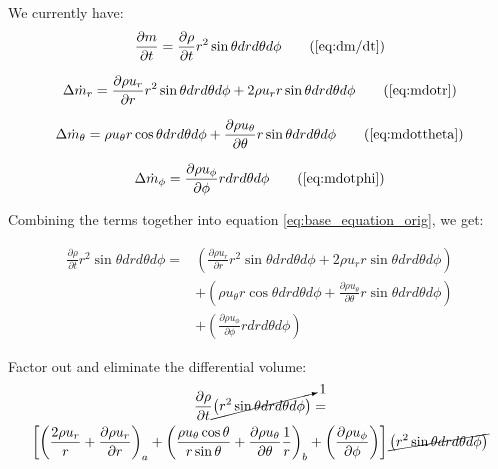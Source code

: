\documentclass[12pt, letterpaper, twoside]{article}
\begin{document}
We currently have:
    \begin{equation}
        \frac{\partial m}{\partial t} = 
        \frac{\partial \rho}{\partial t} r^2 \sin\theta dr d\theta d\phi
        \tag{\ref{eq:dm/dt}}
    \end{equation}

    \begin{equation}
        \Delta\dot{m}_r = \frac{\partial \rho u_r}{\partial r} r^2 \sin\theta dr d\theta d\phi +
        2\rho u_r r\sin\theta dr d\theta d\phi
        \tag{\ref{eq:mdotr}}
    \end{equation}

    \begin{equation}
        \Delta\dot{m}_{\theta} = 
        \rho u_{\theta} r\cos\theta dr d\theta d\phi + 
        \frac{\partial\rho u_{\theta}}{\partial\theta} r\sin\theta dr d\theta d\phi
        \tag{\ref{eq:mdottheta}}
    \end{equation}

    \begin{equation}
        \Delta\dot{m}_{\phi} = \frac{\partial \rho u_{\phi}}{\partial \phi} r dr d\theta d\phi 
        \tag{\ref{eq:mdotphi}}
    \end{equation}

    Combining the terms together into equation \ref{eq:base_equation_orig}, we get:

    \begin{equation}
        \begin{split}
        \frac{\partial \rho}{\partial t} r^2 \sin\theta dr d\theta d\phi = &
        \left(\frac{\partial \rho u_r}{\partial r} r^2 \sin\theta dr d\theta d\phi +
        2\rho u_r r\sin\theta dr d\theta d\phi \right) \\
        & + \left(\rho u_{\theta} r\cos\theta dr d\theta d\phi + 
        \frac{\partial\rho u_{\theta}}{\partial\theta} r\sin\theta dr d\theta d\phi \right) \\ 
        & + \left(\frac{\partial \rho u_{\phi}}{\partial \phi} r dr d\theta d\phi \right)
        \end{split}
    \end{equation}

    Factor out and eliminate the differential volume:
    \begin{multline*}
        \frac{\partial \rho}{\partial t} \cancelto{1}{\left( r^2 \sin\theta dr d\theta d\phi \right)} = \\
        \left[
        \left(\frac{2 \rho u_r}{r} + \frac{\partial \rho u_r}{\partial r} \right)_a
        + \left(\frac{\rho u_{\theta} \cos\theta}{r \sin\theta} + 
        \frac{\partial\rho u_{\theta}}{\partial\theta} \frac{1}{r} \right)_b
        + \left(\frac{\partial \rho u_{\phi}}{\partial \phi} \right)
        \right] \cancel{\left( r^2 \sin\theta dr d\theta d\phi \right)}
    \end{multline*}
\end{document}

